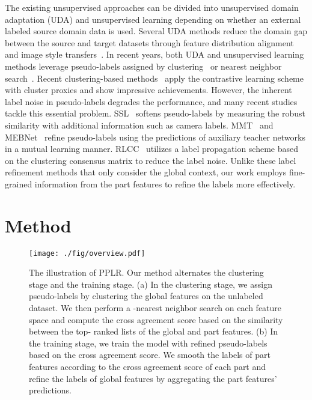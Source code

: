 \documentclass[10pt,twocolumn,letterpaper]{article}
\newcommand{\paragraphTitle}[1]{\vspace{1mm}\noindent{\textbf{#1}\hspace{1mm}}}
\begin{document}
\paragraphTitle{Unsupervised approaches for person re-ID.} {
    The existing unsupervised approaches can be divided into unsupervised domain adaptation (UDA) and unsupervised learning depending on whether an external labeled source domain data is used.
    Several UDA methods reduce the domain gap between the source and target datasets through feature distribution alignment~\cite{lin2018multi, wang2018transferable} and image style transfers~\cite{wei2018person, deng2018image, Zhong_2018_ECCV}.
    In recent years, both UDA and unsupervised learning methods leverage pseudo-labels assigned by clustering~\cite{lin2019aBottom, zeng2020hierarchical, song2020unsupervised} or nearest neighbor search~\cite{wang2020unsupervised, yu2019unsupervised, zhong2019invariance}.
    Recent clustering-based methods~\cite{ge2020selfpaced, wang2021camera, chen2021ice} apply the contrastive learning scheme with cluster proxies and show impressive achievements.
    However, the inherent label noise in pseudo-labels degrades the performance, and many recent studies tackle this essential problem.
    SSL~\cite{lin2020unsupervised} softens pseudo-labels by measuring the robust similarity with additional information such as camera labels.
    MMT~\cite{ge2020mutual} and MEBNet~\cite{zhai2020multiple} refine pseudo-labels using the predictions of auxiliary teacher networks in a mutual learning manner.
    RLCC~\cite{zhang2021refining} utilizes a label propagation scheme based on the clustering consensus matrix to reduce the label noise.
    Unlike these label refinement methods that only consider the global context, our work employs fine-grained information from the part features to refine the labels more effectively.
}
 \section{Method} 
\label{sec:3}
    \begin{figure*}[t]
        \centering
        \texttt{[image: ./fig/overview.pdf]}
        \caption{ 
            The illustration of PPLR.
            Our method alternates the clustering stage and the training stage.
            (a) In the clustering stage, we assign pseudo-labels by clustering the global features on the unlabeled dataset.
            We then perform a -nearest neighbor search on each feature space and compute the cross agreement score based on the similarity between the top- ranked lists of the global and part features.
            (b) In the training stage, we train the model with refined pseudo-labels based on the cross agreement score.
            We smooth the labels of part features according to the cross agreement score of each part and refine the labels of global features by aggregating the part features' predictions.
        }
    \label{fig:overview}
    \vspace{-5mm}
    \end{figure*}
    
\end{document}
